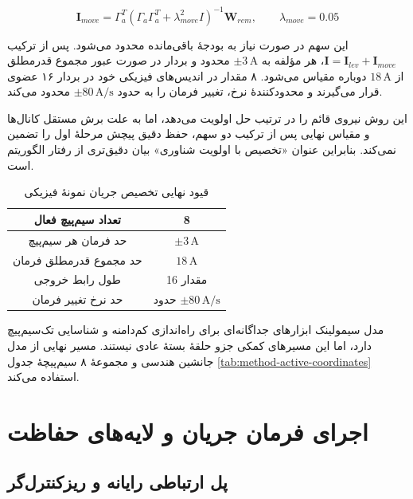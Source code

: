 \begin{equation}
	\mathbf I_{move}=\Gamma_a^T
	(\Gamma_a\Gamma_a^T+\lambda_{move}^2I)^{-1}\mathbf W_{rem},
	\qquad \lambda_{move}=0.05
	\label{eq:method-motion-allocation}
\end{equation}

این سهم در صورت نیاز به بودجهٔ باقی‌مانده محدود می‌شود. پس از ترکیب $\mathbf I=\mathbf I_{lev}+\mathbf I_{move}$، هر مؤلفه به $\pm3\,\mathrm A$ محدود و بردار در صورت عبور مجموع قدرمطلق از $18\,\mathrm A$ دوباره مقیاس می‌شود. ۸ مقدار در اندیس‌های فیزیکی خود در بردار ۱۶ عضوی قرار می‌گیرند و محدودکنندهٔ نرخ، تغییر فرمان را به حدود $\pm80\,\mathrm{A/s}$ محدود می‌کند.

این روش نیروی قائم را در ترتیب حل اولویت می‌دهد، اما به علت برش مستقل کانال‌ها و مقیاس نهایی پس از ترکیب دو سهم، حفظ دقیق پیچش مرحلهٔ اول را تضمین نمی‌کند. بنابراین عنوان «تخصیص با اولویت شناوری» بیان دقیق‌تری از رفتار الگوریتم است.

\begin{table}[!htbp]
	\centering
	\caption{قیود نهایی تخصیص جریان نمونهٔ فیزیکی}
	\label{tab:method-current-constraints-physical}
	\begin{tabular}{|c|c|}
		\hline
		تعداد سیم‌پیچ فعال & 8\\ \hline
		حد فرمان هر سیم‌پیچ & $\pm3\,\mathrm A$\\ \hline
		حد مجموع قدرمطلق فرمان & $18\,\mathrm A$\\ \hline
		طول رابط خروجی & 16 مقدار\\ \hline
		حد نرخ تغییر فرمان & حدود $\pm80\,\mathrm{A/s}$\\ \hline
	\end{tabular}
\end{table}

مدل سیمولینک ابزارهای جداگانه‌ای برای راه‌اندازی کم‌دامنه و شناسایی تک‌سیم‌پیچ دارد، اما این مسیرهای کمکی جزو حلقهٔ بستهٔ عادی نیستند. مسیر نهایی از مدل جانشین هندسی و مجموعهٔ ۸ سیم‌پیچهٔ جدول \ref{tab:method-active-coordinates} استفاده می‌کند.

\section{اجرای فرمان جریان و لایه‌های حفاظت}
\label{sec:method-current-driver}

\subsection{پل ارتباطی رایانه و ریزکنترل‌گر}

